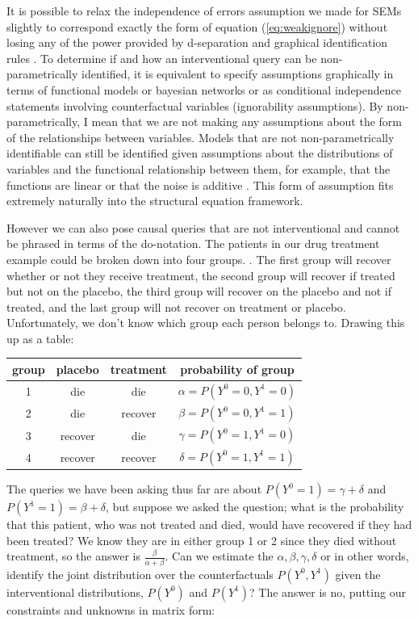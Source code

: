 \documentclass[11pt,a4paper,oneside]{book}
\theoremstyle{plain}
\theoremstyle{definition}
\begin{document}
It is possible to relax the independence of errors assumption we made for SEMs slightly to correspond exactly the form of equation (\ref{eq:weakignore}) without losing any of the power provided by d-separation and graphical identification rules \cite{Richardson2013}. To determine if and how an interventional query can be non-parametrically identified, it is equivalent to specify assumptions graphically in terms of functional models or bayesian networks or as conditional independence statements involving counterfactual variables (ignorability assumptions). By non-parametrically, I mean that we are not making any assumptions about the form of the relationships between variables. Models that are not non-parametrically identifiable can still be identified given assumptions about the distributions of variables and the functional relationship between them, for example, that the functions are linear or that the noise is additive \cite{Peters2014}. This form of assumption fits extremely naturally into the structural equation framework. 


However we can also pose causal queries that are not interventional and cannot be phrased in terms of the do-notation. The patients in our drug treatment example could be broken down into four groups. . The first group will recover whether or not they receive treatment, the second group will recover if treated but not on the placebo, the third group will recover on the placebo and not if treated, and the last group will not recover on treatment or placebo. Unfortunately, we don't know which group each person belongs to. Drawing this up as a table:

\begin{tabular}{c|c|c|c}
group & placebo & treatment & probability of group\\
\hline
1 & die & die & $\alpha=P(Y^{0}=0,Y^{1}=0)$\\
2 & die & recover & $\beta=P(Y^{0}=0,Y^{1}=1)$\\
3 & recover & die & $\gamma=P(Y^{0}=1,Y^{1}=0)$\\
4 & recover & recover & $\delta=P(Y^{0}=1,Y^{1}=1)$\\
\end{tabular}

The queries we have been asking thus far are about $P(Y^{0}=1) = \gamma + \delta$ and $P(Y^{1}=1) = \beta + \delta$, but suppose we asked the question; what is the probability that this patient, who was not treated and died, would have recovered if they had been treated? We know they are in either group 1 or 2 since they died without treatment, so the answer is $\frac{\beta}{\alpha+\beta}$. Can we estimate the $\alpha, \beta, \gamma, \delta$ or in other words, identify the joint distribution over the counterfactuals $P(Y^{0},Y^{1})$ given the interventional distributions, $P(Y^{0})$ and $P(Y^{1})$? The answer is no, putting our constraints and unknowns in matrix form:
\end{document}
